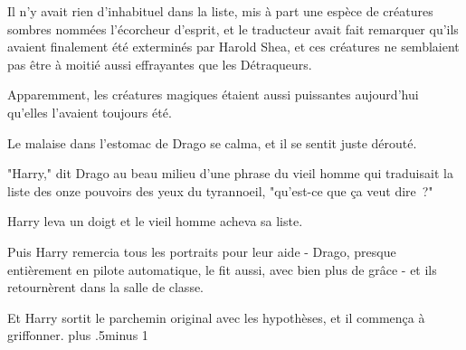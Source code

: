 Il n'y avait rien d'inhabituel dans la liste, mis à part une espèce de créatures sombres nommées l'écorcheur d'esprit, et le traducteur avait fait remarquer qu'ils avaient finalement été exterminés par Harold Shea, et ces créatures ne semblaient pas être à moitié aussi effrayantes que les Détraqueurs.

Apparemment, les créatures magiques étaient aussi puissantes aujourd'hui qu'elles l'avaient toujours été.

Le malaise dans l'estomac de Drago se calma, et il se sentit juste dérouté.

"Harry," dit Drago au beau milieu d'une phrase du vieil homme qui traduisait la liste des onze pouvoirs des yeux du tyrannoeil, "qu'est-ce que ça veut dire~?"

Harry leva un doigt et le vieil homme acheva sa liste.

Puis Harry remercia tous les portraits pour leur aide - Drago, presque entièrement en pilote automatique, le fit aussi, avec bien plus de grâce - et ils retournèrent dans la salle de classe.

Et Harry sortit le parchemin original avec les hypothèses, et il commença à griffonner.
\baselineskip plus .5\textheight minus 1\baselineskip

\savetrivseps
\setlength{\topsep}{0pt}
\setlength{\partopsep}{0pt}

